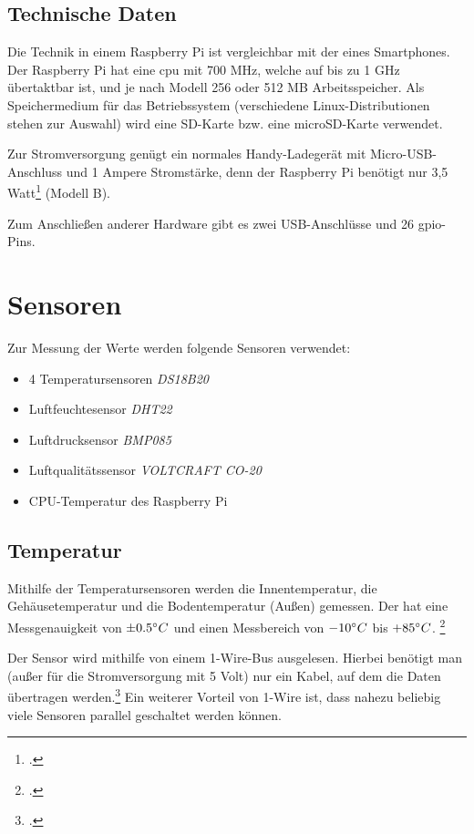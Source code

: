 \subsection{Technische Daten}
Die Technik in einem Raspberry Pi ist vergleichbar mit der eines Smartphones. Der Raspberry Pi hat eine \acrshort{cpu} mit 700 MHz, welche auf bis zu 1 GHz übertaktbar ist, und je nach Modell 256 oder 512 MB Arbeitsspeicher. Als Speichermedium für das Betriebssystem (verschiedene Linux-Distributionen stehen zur Auswahl) wird eine SD-Karte bzw. eine microSD-Karte verwendet.

Zur Stromversorgung genügt ein normales Handy-Ladegerät mit Micro-USB-Anschluss und 1 \gls{Ampere} Stromstärke, denn der Raspberry Pi benötigt nur 3,5 Watt\footcite{strom} (Modell B).

Zum Anschließen anderer Hardware gibt es zwei USB-Anschlüsse und 26 \gls{gpio}-Pins.

\section{Sensoren}
Zur Messung der Werte werden folgende Sensoren verwendet:
\begin{itemize}
\item 4 Temperatursensoren \textit{DS18B20}
\item Luftfeuchtesensor \textit{DHT22}
\item Luftdrucksensor \textit{BMP085}
\item Luftqualitätssensor \textit{VOLTCRAFT CO-20}
\item CPU-Temperatur des Raspberry Pi
\end{itemize}
\subsection{Temperatur}


Mithilfe der Temperatursensoren werden die Innentemperatur, die Gehäusetemperatur und die Bodentemperatur (Außen) gemessen. Der hat eine Messgenauigkeit von $\pm 0.5\degree C$  und einen Messbereich von $-10\degree C$ bis $+85\degree C$. \footcite[20]{temp}

Der Sensor wird mithilfe von einem 1-Wire-Bus ausgelesen. Hierbei benötigt man (außer für die Stromversorgung mit 5 \gls{Volt}) nur ein Kabel, auf dem die Daten übertragen werden.\footcite{1-wire}
Ein weiterer Vorteil von 1-Wire ist, dass nahezu beliebig viele Sensoren parallel geschaltet werden können.

